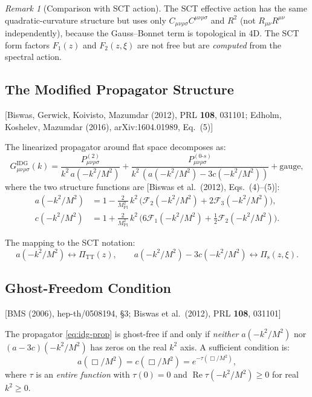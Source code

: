 \documentclass[11pt,a4paper]{article}
\theoremstyle{plain}
\theoremstyle{definition}
\theoremstyle{remark}
\newtheorem{remark}[theorem]{Remark}
\newcommand{\Ricsq}{R_{\mu\nu}R^{\mu\nu}}
\newcommand{\Weylsq}{C_{\mu\nu\rho\sigma}C^{\mu\nu\rho\sigma}}
\newcommand{\fromlit}[1]{\textcolor{sctblue}{\textsf{[#1]}}}
\begin{document}
\begin{remark}[Comparison with SCT action]
The SCT effective action has the same quadratic-curvature structure
but uses only $\Weylsq$ and $R^2$ (not $\Ricsq$ independently),
because the Gauss--Bonnet term is topological in 4D.  The SCT form
factors $F_1(z)$ and $F_2(z,\xi)$ are not free but are
\emph{computed} from the spectral action.
\end{remark}

\subsection{The Modified Propagator Structure}

\fromlit{Biswas, Gerwick, Koivisto, Mazumdar (2012), PRL \textbf{108},
031101; Edholm, Koshelev, Mazumdar (2016), arXiv:1604.01989, Eq.~(5)}

The linearized propagator around flat space decomposes as:
\begin{equation}\label{eq:idg-prop}
  G_{\mu\nu\rho\sigma}^{\mathrm{IDG}}(k)
  = \frac{P^{(2)}_{\mu\nu\rho\sigma}}{k^2\,a(-k^2/M^2)}
  + \frac{P^{(0\text{-}s)}_{\mu\nu\rho\sigma}}
         {k^2\,(a(-k^2/M^2) - 3c(-k^2/M^2))}
  + \text{gauge},
\end{equation}
where the two structure functions are
\fromlit{Biswas et al.\ (2012), Eqs.~(4)--(5)}:
\begin{align}
  a(-k^2/M^2) &= 1 - \frac{2}{M_{\mathrm{Pl}}^2}\,k^2\,
    \big(\mathcal{F}_2(-k^2/M^2) + 2\mathcal{F}_3(-k^2/M^2)\big),
    \label{eq:a-func}\\
  c(-k^2/M^2) &= 1 + \frac{2}{M_{\mathrm{Pl}}^2}\,k^2\,
    \big(6\mathcal{F}_1(-k^2/M^2)
    + \tfrac{1}{2}\mathcal{F}_2(-k^2/M^2)\big).
    \label{eq:c-func}
\end{align}

The mapping to the SCT notation:
\begin{equation}\label{eq:idg-to-sct}
  a(-k^2/M^2) \longleftrightarrow \Pi_{\mathrm{TT}}(z),\qquad
  a(-k^2/M^2) - 3c(-k^2/M^2) \longleftrightarrow \Pi_{\mathrm{s}}(z,\xi).
\end{equation}

\subsection{Ghost-Freedom Condition}

\fromlit{BMS (2006), hep-th/0508194, \S3; Biswas et al.\ (2012),
PRL \textbf{108}, 031101}

The propagator \eqref{eq:idg-prop} is ghost-free if and only if
\emph{neither} $a(-k^2/M^2)$ nor $(a - 3c)(-k^2/M^2)$ has zeros
on the real $k^2$ axis.  A sufficient condition is:
\begin{equation}\label{eq:ghost-free}
  a(\Box/M^2) = c(\Box/M^2) = e^{-\tau(\Box/M^2)},
\end{equation}
where $\tau$ is an \emph{entire function} with $\tau(0) = 0$
and $\operatorname{Re}\tau(-k^2/M^2) \geq 0$ for real $k^2 \geq 0$.
\end{document}
